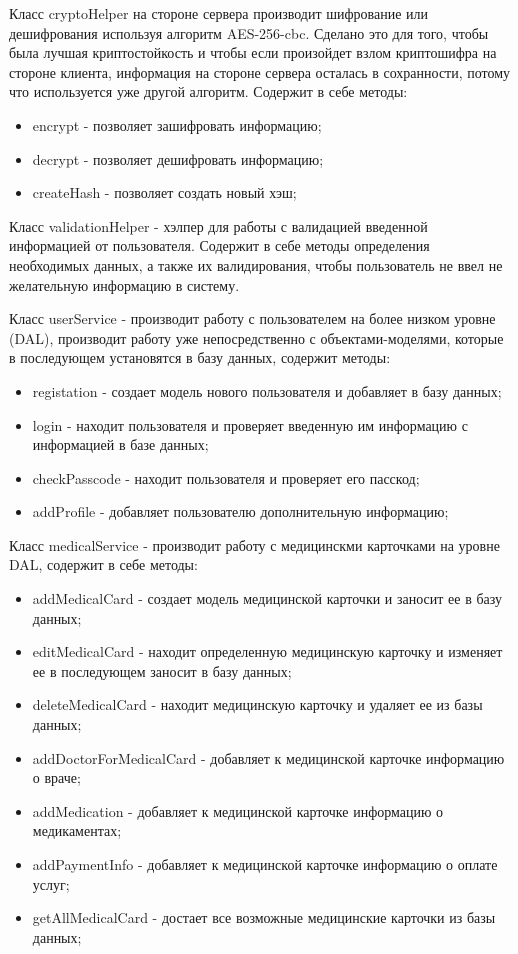 Класс cryptoHelper на стороне сервера производит шифрование или дешифрования используя алгоритм AES-256-cbc. Сделано это для того, чтобы была лучшая криптостойкость и чтобы если произойдет взлом криптошифра на стороне клиента, информация на стороне сервера осталась в сохранности, потому что используется уже другой алгоритм. Содержит в себе методы:
\begin{itemize}
  \item encrypt - позволяет зашифровать информацию;
  \item decrypt - позволяет дешифровать информацию;
  \item createHash - позволяет создать новый хэш;
\end{itemize}

Класс validationHelper - хэлпер для работы с валидацией введенной информацией от пользователя. Содержит в себе методы определения необходимых данных, а также их валидирования, чтобы пользователь не ввел не желательную информацию в систему.

Класс userService - производит работу с пользователем на более низком уровне (DAL), производит работу уже непосредственно с объектами-моделями, которые в последующем установятся в базу данных, содержит методы:
\begin{itemize}
  \item registation - создает модель нового пользователя и добавляет в базу данных;
  \item login - находит пользователя и проверяет введенную им информацию с информацией в базе данных;
  \item checkPasscode - находит пользователя и проверяет его пасскод;
  \item addProfile - добавляет пользователю дополнительную информацию;
\end{itemize}

Класс medicalService - производит работу с медицинскми карточками на уровне DAL, содержит в себе методы:
\begin{itemize}
  \item addMedicalCard - создает модель медицинской карточки и заносит ее в базу данных;
  \item editMedicalCard - находит определенную медицинскую карточку и изменяет ее в последующем заносит в базу данных;
  \item deleteMedicalCard - находит медицинскую карточку и удаляет ее из базы данных;
  \item addDoctorForMedicalCard - добавляет к медицинской карточке информацию о враче;
  \item addMedication - добавляет к медицинской карточке информацию о медикаментах;
  \item addPaymentInfo - добавляет к медицинской карточке информацию о оплате услуг;
  \item getAllMedicalCard - достает все возможные медицинские карточки из базы данных;
\end{itemize}

